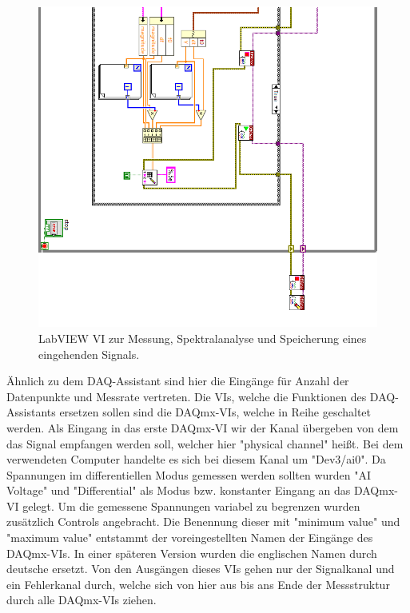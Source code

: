 \begin{figure}[H]
	\centering
	\includegraphics[width=\textwidth]{pic/messstruktur2.png}	
	\caption{LabVIEW VI zur Messung, Spektralanalyse und Speicherung eines eingehenden Signals.}
	\label{fig:messstruktur}
\end{figure}

\thispagestyle{empty}
Ähnlich zu dem DAQ-Assistant sind hier die Eingänge für Anzahl der Datenpunkte und Messrate vertreten.
Die VIs, welche die Funktionen des DAQ-Assistants ersetzen sollen sind die DAQmx-VIs, welche in Reihe geschaltet werden.
Als Eingang in das erste DAQmx-VI wir der Kanal übergeben von dem das Signal empfangen werden soll, welcher hier "physical channel" heißt.
Bei dem verwendeten Computer handelte es sich bei diesem Kanal um "Dev3/ai0".
Da Spannungen im differentiellen Modus gemessen werden sollten wurden "AI Voltage" und "Differential" als Modus bzw. konstanter Eingang an das DAQmx-VI gelegt. 
Um die gemessene Spannungen variabel zu begrenzen wurden zusätzlich Controls angebracht.
Die Benennung dieser mit "minimum value" und "maximum value" entstammt der voreingestellten Namen der Eingänge des DAQmx-VIs.
In einer späteren Version wurden die englischen Namen durch deutsche ersetzt.
Von den Ausgängen dieses VIs gehen nur der Signalkanal und ein Fehlerkanal durch, welche sich von hier aus bis ans Ende der Messstruktur durch alle DAQmx-VIs ziehen.
	
